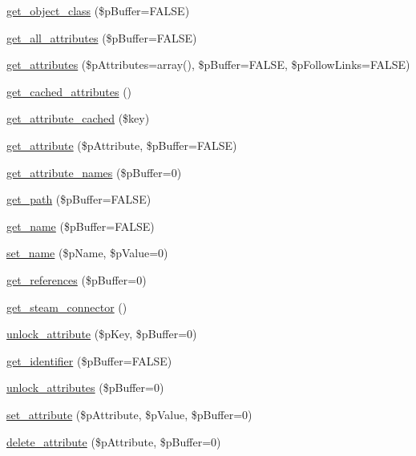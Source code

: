 \begin{DoxyCompactItemize}
\item 
\hyperlink{classsteam__object_acdd65797320a293181647bb480836c31}{get\_\-object\_\-class} (\$pBuffer=FALSE)
\item 
\hyperlink{classsteam__object_a923a28e57836b1316e65f7f3b6b09a70}{get\_\-all\_\-attributes} (\$pBuffer=FALSE)
\item 
\hyperlink{classsteam__object_ade749eb10db9e93fd48cc0b184daa4b9}{get\_\-attributes} (\$pAttributes=array(), \$pBuffer=FALSE, \$pFollowLinks=FALSE)
\item 
\hyperlink{classsteam__object_a4173554c2699242e93a81cd8ac8687ff}{get\_\-cached\_\-attributes} ()
\item 
\hyperlink{classsteam__object_a57470de24239e9c712ea6647614845d5}{get\_\-attribute\_\-cached} (\$key)
\item 
\hyperlink{classsteam__object_a23cb70e84c9b451054dc89a674781bf4}{get\_\-attribute} (\$pAttribute, \$pBuffer=FALSE)
\item 
\hyperlink{classsteam__object_a68c7b345557c9967cc5de22f5be91d3e}{get\_\-attribute\_\-names} (\$pBuffer=0)
\item 
\hyperlink{classsteam__object_aef27ff3b07d084862c8179eff23600f1}{get\_\-path} (\$pBuffer=FALSE)
\item 
\hyperlink{classsteam__object_a494cbd97e97602a5cd1e44b31d024d27}{get\_\-name} (\$pBuffer=FALSE)
\item 
\hyperlink{classsteam__object_a6789710911e1e0011e860dbf2d7cff26}{set\_\-name} (\$pName, \$pValue=0)
\item 
\hyperlink{classsteam__object_af1bfbfd861bab5ec052e6106150673b8}{get\_\-references} (\$pBuffer=0)
\item 
\hyperlink{classsteam__object_a8eace8a94a25a2d901807ca6a45ec67e}{get\_\-steam\_\-connector} ()
\item 
\hyperlink{classsteam__object_a1cf973c61686edd9fb49c910a36c1ea9}{unlock\_\-attribute} (\$pKey, \$pBuffer=0)
\item 
\hyperlink{classsteam__object_aac6a90752a171a84aa110bb7bb5a7458}{get\_\-identifier} (\$pBuffer=FALSE)
\item 
\hyperlink{classsteam__object_a9d3f6bb2e71f72fa4c3d5f462a3cad04}{unlock\_\-attributes} (\$pBuffer=0)
\item 
\hyperlink{classsteam__object_a05f96da9470605f1c281efda11710ed2}{set\_\-attribute} (\$pAttribute, \$pValue, \$pBuffer=0)
\item 
\hyperlink{classsteam__object_ade0fd7d66d2bdc8e023a191262f46489}{delete\_\-attribute} (\$pAttribute, \$pBuffer=0)

\end{DoxyCompactItemize}
